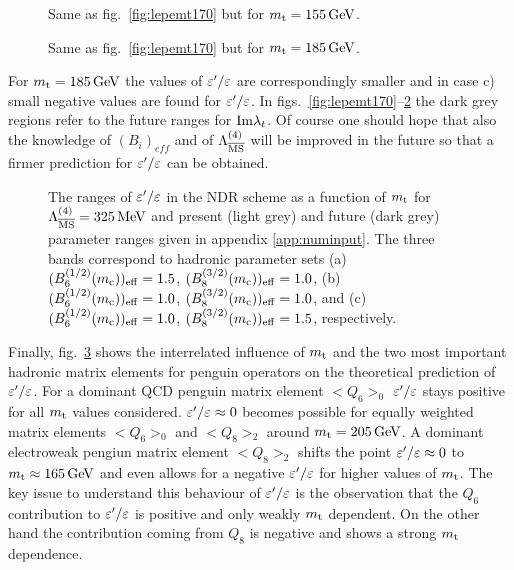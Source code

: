 \begin{figure}[htb]
\vspace{0.15in}
\centerline{
\epsfysize=6in
}
\vspace{0.15in}
\caption[]{
Same as fig.\ \ref{fig:lepemt170} but for $m_{\rm t}=155\, {\rm GeV}$.
\label{fig:lepemt155}}
\end{figure}

\begin{figure}[htb]
\vspace{0.15in}
\centerline{
\epsfysize=6in
}
\vspace{0.15in}
\caption[]{
Same as fig.\ \ref{fig:lepemt170} but for $m_{\rm t}=185\, {\rm GeV}$.
\label{fig:lepemt185}}
\end{figure}

For $m_{\rm t} = 185\, {\rm GeV}$ the values of $\varepsilon'/\varepsilon$ are correspondingly smaller
and in case c) small negative values are found for $\varepsilon'/\varepsilon$.  In figs.\
\ref{fig:lepemt170}--\ref{fig:lepemt185} the dark grey regions refer to
the future ranges for ${\rm Im}\lambda_t$. Of course one should hope that
also the knowledge of $(B_i)_{eff}$ and of $\Lambda_{\overline{\rm MS}}^{(4)}$ will be
improved in the future so that a firmer prediction for $\varepsilon'/\varepsilon$ can be
obtained.

\begin{figure}[htb]
\vspace{0.15in}
\centerline{
\epsfysize=6in
}
\vspace{0.15in}
\caption[]{
The ranges of $\varepsilon'/\varepsilon$ in the NDR scheme as a function of $m_{\rm t}$
for $\Lambda_{\overline{\rm MS}}^{(4)}=325\, {\rm MeV}$ and present (light grey) and future (dark grey)
parameter ranges given in appendix \ref{app:numinput}. The three bands
correspond to hadronic parameter sets
(a) $(B_6^{(1/2)}(m_{\rm c}))_{\rm eff}=1.5$, $(B_8^{(3/2)}(m_{\rm c}))_{\rm eff}=1.0$,
(b) $(B_6^{(1/2)}(m_{\rm c}))_{\rm eff}=1.0$, $(B_8^{(3/2)}(m_{\rm c}))_{\rm eff}=1.0$,
and
(c) $(B_6^{(1/2)}(m_{\rm c}))_{\rm eff}=1.0$, $(B_8^{(3/2)}(m_{\rm c}))_{\rm eff}=1.5$,
respectively.
\label{fig:mteper1r2f}}
\end{figure}

Finally, fig.\ \ref{fig:mteper1r2f} shows the interrelated influence of
$m_{\rm t}$ and the two most important hadronic matrix elements for penguin
operators on the theoretical prediction of $\varepsilon'/\varepsilon$. For a dominant QCD
penguin matrix element $<Q_6>_0$ $\varepsilon'/\varepsilon$ stays positive for all $m_{\rm t}$
values considered. $\varepsilon'/\varepsilon \approx 0$ becomes possible for equally
weighted matrix elements $<Q_6>_0$ and $<Q_8>_2$ around $m_{\rm t}=205\, {\rm GeV}$.
A dominant electroweak pengiun matrix element $<Q_8>_2$ shifts the
point $\varepsilon'/\varepsilon \approx 0$ to $m_{\rm t} \approx 165\, {\rm GeV}$ and even allows for a
negative $\varepsilon'/\varepsilon$ for higher values of $m_{\rm t}$. The key issue to understand
this behaviour of $\varepsilon'/\varepsilon$ is the observation that the $Q_6$ contribution
to $\varepsilon'/\varepsilon$ is positive and only weakly $m_{\rm t}$ dependent. On the other
hand the contribution coming from $Q_8$ is negative and shows a strong
$m_{\rm t}$ dependence.


